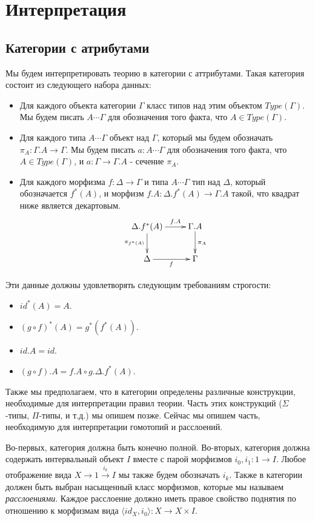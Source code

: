 \documentclass{amsart}
\theoremstyle{definition}
\theoremstyle{remark}
\numberwithin{figure}{section}
\begin{document}
\newpage

\section{Интерпретация}

\subsection{Категории с атрибутами}

Мы будем интерпретировать теорию в категории с аттрибутами.
Такая категория состоит из следующего набора данных:
\begin{itemize}
\item Для каждого объекта категории $\Gamma$ класс типов над этим объектом $Type(\Gamma)$.
    Мы будем писать $A \dotsb \Gamma$ для обозначения того факта, что $A \in Type(\Gamma)$.
\item Для каждого типа $A \dotsb \Gamma$ объект над $\Gamma$, который мы будем обозначать $\pi_A : \Gamma.A \to \Gamma$.
    Мы будем писать $a : A \dotsb \Gamma$ для обозначения того факта, что $A \in Type(\Gamma)$, и $a : \Gamma \to \Gamma.A$ - сечение $\pi_A$.
\item Для каждого морфизма $f : \Delta \to \Gamma$ и типа $A \dotsb \Gamma$ тип над $\Delta$, который обозначается $f^*(A)$,
    и морфизм $f.A : \Delta.f^*(A) \to \Gamma.A$ такой, что квадрат ниже является декартовым.
\[ \xymatrix{ \Delta.f^*(A) \ar[d]_{\pi_{f^*(A)}} \ar[r]^-{f.A} & \Gamma.A \ar[d]^{\pi_A} \\
              \Delta \ar[r]_f & \Gamma
            } \]
\end{itemize}

Эти данные должны удовлетворять следующим требованиям строгости:
\begin{itemize}
\item $id^*(A) = A$.
\item $(g \circ f)^*(A) = g^*(f^*(A))$.
\item $id.A = id$.
\item $(g \circ f).A = f.A \circ g.\Delta.f^*(A)$.
\end{itemize}

Также мы предполагаем, что в категории определены различные конструкции, необходимые для интерпретации правил теории.
Часть этих конструкций ($\Sigma$-типы, $\Pi$-типы, и т.д.) мы опишем позже.
Сейчас мы опишем часть, необходимую для интерпретации гомотопий и расслоений.

Во-первых, категория должна быть конечно полной.
Во-вторых, категория должна содержать интервальный объект $I$ вместе с парой морфизмов $i_0, i_1 : 1 \to I$.
Любое отображение вида $X \to 1 \xrightarrow{i_k} I$ мы также будем обозначать $i_k$.
Также в категории должен быть выбран насыщенный класс морфизмов, которые мы называем \emph{расслоениями}.
Каждое расслоение должно иметь правое свойство поднятия по отношению к морфизмам вида $\langle id_X, i_0 \rangle : X \to X \times I$.
\end{document}

